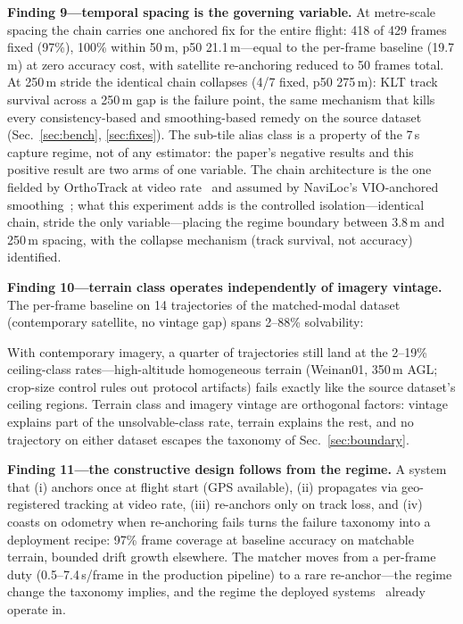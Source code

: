 \documentclass[journal]{IEEEtran}
\begin{document}
\textbf{Finding 9---temporal spacing is the governing variable.} At metre-scale spacing the chain carries one anchored fix for the entire flight: 418 of 429 frames fixed (97\%), 100\% within 50\,m, p50 21.1\,m---equal to the per-frame baseline (19.7\,m) at zero accuracy cost, with satellite re-anchoring reduced to 50 frames total. At 250\,m stride the identical chain collapses (4/7 fixed, p50 275\,m): KLT track survival across a 250\,m gap is the failure point, the same mechanism that kills every consistency-based and smoothing-based remedy on the source dataset (Sec.~\ref{sec:bench}, \ref{sec:fixes}). The sub-tile alias class is a property of the 7\,s capture regime, not of any estimator: the paper's negative results and this positive result are two arms of one variable. The chain architecture is the one fielded by OrthoTrack at video rate~\cite{orthotrack} and assumed by NaviLoc's VIO-anchored smoothing~\cite{naviloc}; what this experiment adds is the controlled isolation---identical chain, stride the only variable---placing the regime boundary between 3.8\,m and 250\,m spacing, with the collapse mechanism (track survival, not accuracy) identified.

\textbf{Finding 10---terrain class operates independently of imagery vintage.} The per-frame baseline on 14 trajectories of the matched-modal dataset (contemporary satellite, no vintage gap) spans 2--88\% solvability:


With contemporary imagery, a quarter of trajectories still land at the 2--19\% ceiling-class rates---high-altitude homogeneous terrain (Weinan01, 350\,m AGL; crop-size control rules out protocol artifacts) fails exactly like the source dataset's ceiling regions. Terrain class and imagery vintage are orthogonal factors: vintage explains part of the unsolvable-class rate, terrain explains the rest, and no trajectory on either dataset escapes the taxonomy of Sec.~\ref{sec:boundary}.

\textbf{Finding 11---the constructive design follows from the regime.} A system that (i) anchors once at flight start (GPS available), (ii) propagates via geo-registered tracking at video rate, (iii) re-anchors only on track loss, and (iv) coasts on odometry when re-anchoring fails turns the failure taxonomy into a deployment recipe: 97\% frame coverage at baseline accuracy on matchable terrain, bounded drift growth elsewhere. The matcher moves from a per-frame duty (0.5--7.4\,s/frame in the production pipeline) to a rare re-anchor---the regime change the taxonomy implies, and the regime the deployed systems~\cite{orthotrack,naviloc,cpfl} already operate in.
\end{document}
